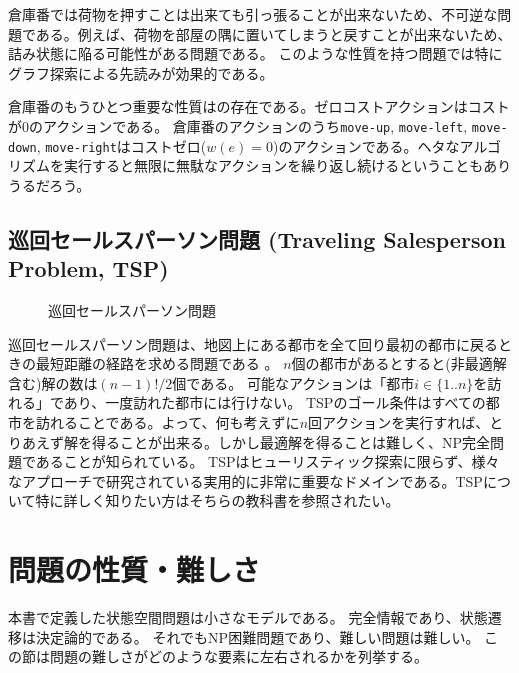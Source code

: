 倉庫番では荷物を押すことは出来ても引っ張ることが出来ないため、不可逆な問題である。例えば、荷物を部屋の隅に置いてしまうと戻すことが出来ないため、詰み状態に陥る可能性がある問題である。
このような性質を持つ問題では特にグラフ探索による先読みが効果的である。

倉庫番のもうひとつ重要な性質はの存在である。ゼロコストアクションはコストが0のアクションである。%
倉庫番のアクションのうち{\tt move-up}, {\tt move-left}, {\tt move-down}, {\tt move-right}はコストゼロ($w(e)=0$)のアクションである。ヘタなアルゴリズムを実行すると無限に無駄なアクションを繰り返し続けるということもありうるだろう。


\subsection{巡回セールスパーソン問題 (Traveling Salesperson Problem, TSP)}

\begin{figure}
\centering
\begin{tikzpicture}[scale=0.7]
  
\end{tikzpicture}
\caption{巡回セールスパーソン問題}
\label{fig:sokoban}
\end{figure}


巡回セールスパーソン問題は、地図上にある都市を全て回り最初の都市に戻るときの最短距離の経路を求める問題である \cite{applegate2006traveling}。
$n$個の都市があるとすると(非最適解含む)解の数は$(n-1)!/2$個である。
可能なアクションは「都市$i \in \{1..n\}$を訪れる」であり、一度訪れた都市には行けない。
TSPのゴール条件はすべての都市を訪れることである。よって、何も考えずに$n$回アクションを実行すれば、とりあえず解を得ることが出来る。しかし最適解を得ることは難しく、NP完全問題であることが知られている。
TSPはヒューリスティック探索に限らず、様々なアプローチで研究されている実用的に非常に重要なドメインである\cite{applegate2006traveling}。TSPについて特に詳しく知りたい方はそちらの教科書を参照されたい。


\section{問題の性質・難しさ}
\label{sec:difficulity}

本書で定義した状態空間問題は小さなモデルである。
完全情報であり、状態遷移は決定論的である。
それでもNP困難問題であり、難しい問題は難しい。
この節は問題の難しさがどのような要素に左右されるかを列挙する。

